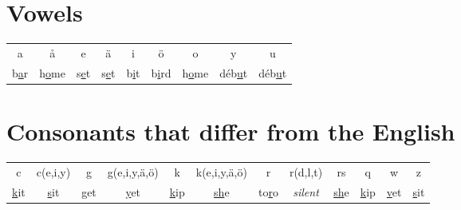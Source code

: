 \section*{Vowels}

\begin{tabular}{ccccccccc}
a & \aa & e & \"a & i & \"o & o & y & u \\
b\underline{a}r & h\underline{o}me & s\underline{e}t & s\underline{e}t & b\underline{i}t & b\underline{i}rd & h\underline{o}me & d\'eb\underline{u}t & d\'eb\underline{u}t \\
\end{tabular}


\section*{Consonants that differ from the English}

\begin{tabular}{cccccccccccc}
c & c(e,i,y) & g & g(e,i,y,\"a,\"o) & k & k(e,i,y,\"a,\"o) & r & r(d,l,t) & rs & q & w & z \\
\underline{k}it & \underline{s}it & \underline{g}et & \underline{y}et & \underline{k}ip & \underline{sh}e & to\underline{r}o & \textit{silent} & \underline{sh}e & \underline{k}ip & \underline{v}et & \underline{s}it \\
\end{tabular}
